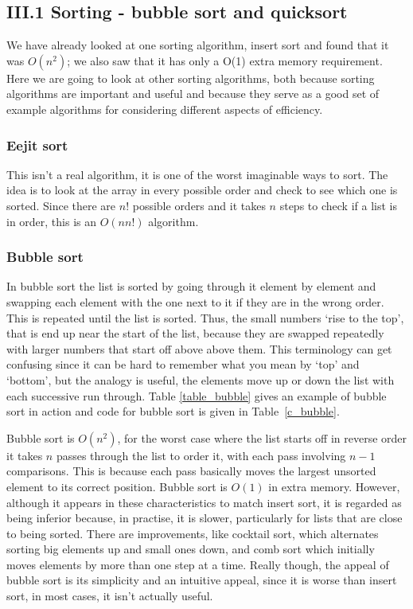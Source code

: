 \documentclass[11pt,a4paper]{scrartcl}
\begin{document}
\subsection*{III.1 Sorting - bubble sort and quicksort}

We have already looked at one sorting algorithm, insert sort and found
that it was $O(n^2)$; we also saw that it has only a O(1) extra memory
requirement. Here we are going to look at other sorting algorithms,
both because sorting algorithms are important and useful and because
they serve as a good set of example algorithms for considering
different aspects of efficiency.

\subsubsection*{Eejit sort}

This isn't a real algorithm, it is one of the worst imaginable ways to
sort. The idea is to look at the array in every possible order and
check to see which one is sorted. Since there are $n!$
possible orders and it takes $n$ steps to check if a list is in order,
this is an $O(nn!)$ algorithm. 

\subsubsection*{Bubble sort}

In bubble sort the list is sorted by going through it element by
element and swapping each element with the one next to it if they are
in the wrong order. This is repeated until the list is sorted. Thus,
the small numbers \lq{}rise to the top\rq{}, that is end up near the
start of the list, because they are swapped repeatedly with larger
numbers that start off above above them. This terminology can get
confusing since it can be hard to remember what you mean by
\lq{}top\rq{} and \lq{}bottom\rq{}, but the analogy is useful, the
elements move up or down the list with each successive run
through. Table \ref{table_bubble} gives an example of bubble sort in
action and code for bubble sort is given in Table~\ref{c_bubble}.

Bubble sort is $O(n^2)$, for the worst case where the list starts off
in reverse order it takes $n$ passes through the list to order it,
with each pass involving $n-1$ comparisons. This is because each pass
basically moves the largest unsorted element to its correct
position. Bubble sort is $O(1)$ in extra memory. However, although it
appears in these characteristics to match insert sort, it is regarded
as being inferior because, in practise, it is slower, particularly for
lists that are close to being sorted. There are improvements, like
cocktail sort, which alternates sorting big elements up and small ones
down, and comb sort which initially moves elements by more than one
step at a time. Really though, the appeal of bubble sort is its
simplicity and an intuitive appeal, since it is worse than insert
sort, in most cases, it isn't actually useful.
\end{document}
